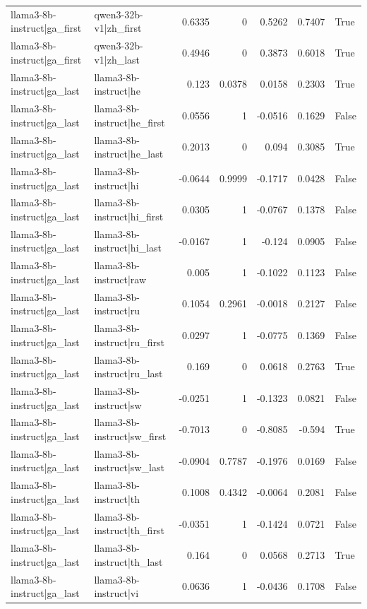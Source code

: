 \begin{table}
\begin{tabular}{l l r r r r l}
llama3-8b-instruct|ga_first & qwen3-32b-v1|zh_first & 0.6335 & 0 & 0.5262 & 0.7407 & True \\
llama3-8b-instruct|ga_first & qwen3-32b-v1|zh_last & 0.4946 & 0 & 0.3873 & 0.6018 & True \\
llama3-8b-instruct|ga_last & llama3-8b-instruct|he & 0.123 & 0.0378 & 0.0158 & 0.2303 & True \\
llama3-8b-instruct|ga_last & llama3-8b-instruct|he_first & 0.0556 & 1 & -0.0516 & 0.1629 & False \\
llama3-8b-instruct|ga_last & llama3-8b-instruct|he_last & 0.2013 & 0 & 0.094 & 0.3085 & True \\
llama3-8b-instruct|ga_last & llama3-8b-instruct|hi & -0.0644 & 0.9999 & -0.1717 & 0.0428 & False \\
llama3-8b-instruct|ga_last & llama3-8b-instruct|hi_first & 0.0305 & 1 & -0.0767 & 0.1378 & False \\
llama3-8b-instruct|ga_last & llama3-8b-instruct|hi_last & -0.0167 & 1 & -0.124 & 0.0905 & False \\
llama3-8b-instruct|ga_last & llama3-8b-instruct|raw & 0.005 & 1 & -0.1022 & 0.1123 & False \\
llama3-8b-instruct|ga_last & llama3-8b-instruct|ru & 0.1054 & 0.2961 & -0.0018 & 0.2127 & False \\
llama3-8b-instruct|ga_last & llama3-8b-instruct|ru_first & 0.0297 & 1 & -0.0775 & 0.1369 & False \\
llama3-8b-instruct|ga_last & llama3-8b-instruct|ru_last & 0.169 & 0 & 0.0618 & 0.2763 & True \\
llama3-8b-instruct|ga_last & llama3-8b-instruct|sw & -0.0251 & 1 & -0.1323 & 0.0821 & False \\
llama3-8b-instruct|ga_last & llama3-8b-instruct|sw_first & -0.7013 & 0 & -0.8085 & -0.594 & True \\
llama3-8b-instruct|ga_last & llama3-8b-instruct|sw_last & -0.0904 & 0.7787 & -0.1976 & 0.0169 & False \\
llama3-8b-instruct|ga_last & llama3-8b-instruct|th & 0.1008 & 0.4342 & -0.0064 & 0.2081 & False \\
llama3-8b-instruct|ga_last & llama3-8b-instruct|th_first & -0.0351 & 1 & -0.1424 & 0.0721 & False \\
llama3-8b-instruct|ga_last & llama3-8b-instruct|th_last & 0.164 & 0 & 0.0568 & 0.2713 & True \\
llama3-8b-instruct|ga_last & llama3-8b-instruct|vi & 0.0636 & 1 & -0.0436 & 0.1708 & False \\

\end{tabular}
\end{table}
